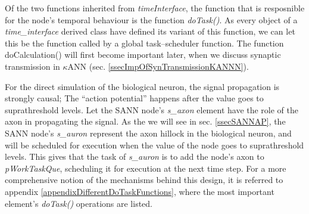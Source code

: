 	Of the two functions inherited from \emph{timeInterface}, %
		the function that is resposnible for the node's temporal behaviour is the function \emph{doTask()}.
	As every object of a \emph{time\_interface} derived class have defined its variant of this function, we can let this be the function called by a global task--scheduler function. %
	The function doCalculation() will first become important later, when we discuss synaptic transmission in $\kappa$ANN (sec. \ref{ssecImpOfSynTransmissionKANNN}). 
	 



	For the direct simulation of the biological neuron, the signal propagation is strongly causal; The ``action potential'' happens after the value goes to suprathreshold levels.
	Let the SANN node's \emph{s\_axon} element have the role of the axon in propagating the signal.
	As the we will see in sec. \ref{ssecSANNAP}, the SANN node's \emph{s\_auron} represent the axon hillock in the biological neuron, and will be scheduled for execution when the value of the node goes to suprathreshold levels.
	This gives that the task of \emph{s\_auron} is to add the node's axon to \emph{pWorkTaskQue}, scheduling it for execution at the next time step.
	For a more comprehensive notion of the mechanisms behind this design, it is referred to appendix \ref{appendixDifferentDoTaskFunctions}, where the most important element's \emph{doTask()} operations are listed.

